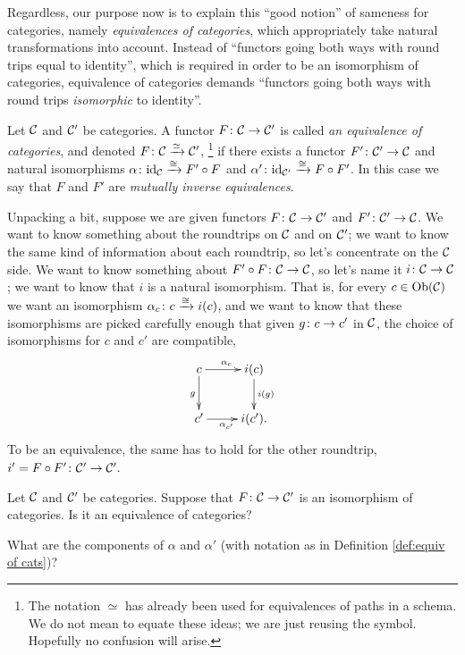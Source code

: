 \documentclass[CT4S-EN-RU]{subfiles}
\begin{document}
Regardless, our purpose now is to explain this “good notion” of sameness for categories, namely {\em equivalences of categories}, which appropriately take natural transformations into account. Instead of “functors going both ways with round trips equal to identity”, which is required in order to be an isomorphism of categories, equivalence of categories demands “functors going both ways with round trips {\em isomorphic} to identity”.

\begin{definition}\label{def:equiv of cats}

Let $\mathcal{C}$ and $\mathcal{C}'$ be categories. A functor $F\colon\mathcal{C}\rightarrow\mathcal{C}'$ is called {\em an equivalence of categories}, and denoted $F\colon\mathcal{C}\xrightarrow{\simeq}\mathcal{C}'$,
\footnote{The notation $\simeq$ has already been used for equivalences of paths in a schema. We do not mean to equate these ideas; we are just reusing the symbol. Hopefully no confusion will arise.}
 if there exists a functor $F'\colon\mathcal{C}'\rightarrow\mathcal{C}$ and natural isomorphisms $\alpha\colon \textnormal{id}_\mathcal{C}\xrightarrow{\cong}F'\circ F$ and $\alpha'\colon\textnormal{id}_{\mathcal{C}'}\xrightarrow{\cong}F\circ F'$. In this case we say that $F$ and $F'$ are {\em mutually inverse equivalences}.

\end{definition}

Unpacking a bit, suppose we are given functors $F\colon\mathcal{C}\rightarrow\mathcal{C}'$ and $F'\colon\mathcal{C}'\rightarrow\mathcal{C}$. We want to know something about the roundtrips on $\mathcal{C}$ and on $\mathcal{C}'$; we want to know the same kind of information about each roundtrip, so let's concentrate on the $\mathcal{C}$ side. We want to know something about $F'\circ F\colon\mathcal{C}\rightarrow\mathcal{C}$, so let's name it $i\colon\mathcal{C}\rightarrow\mathcal{C}$; we want to know that $i$ is a natural isomorphism. That is, for every $c\in\textnormal{Ob}(\mathcal{C})$ we want an isomorphism $\alpha_c\colon c\xrightarrow{\cong} i(c)$, and we want to know that these isomorphisms are picked carefully enough that given $g\colon c\rightarrow c'$ in $\mathcal{C}$, the choice of isomorphisms for $c$ and $c'$ are compatible,
$$\xymatrix{c\ar[r]^{\alpha_c}\ar[d]_g&i(c)\ar[d]^{i(g)}\\c'\ar[r]_{\alpha_{c'}}&i(c').}$$
To be an equivalence, the same has to hold for the other roundtrip, $i'=F\circ F'\colon\mathcal{C}'\rightarrow\mathcal{C}'.$

\begin{exercise}
Let $\mathcal{C}$ and $\mathcal{C}'$ be categories. Suppose that $F\colon\mathcal{C}\rightarrow\mathcal{C}'$ is an isomorphism of categories.
\sexc Is it an equivalence of categories?
\item What are the components of $\alpha$ and $\alpha'$ (with notation as in Definition \ref{def:equiv of cats})?
\endsexc
\end{exercise}
\end{document}
